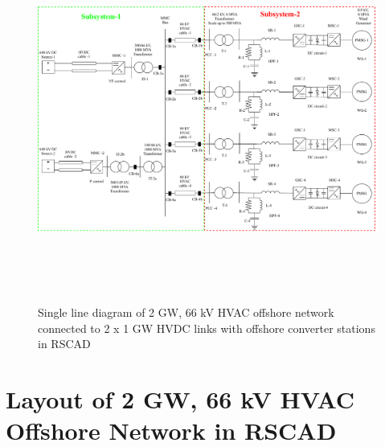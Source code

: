 \begin{figure}[H]
    \includegraphics[height = 12cm,width = \textwidth]{Diagrams/Chapter_4/WT4_MMC2_new.pdf}
    \caption{Single line diagram of 2 GW, 66 kV HVAC offshore network connected to 2 x 1 GW HVDC links with offshore converter stations in RSCAD}
    \label{fig:WT4_MMC2}
\end{figure}

\section{Layout of 2 GW, 66 kV HVAC Offshore Network in RSCAD}

